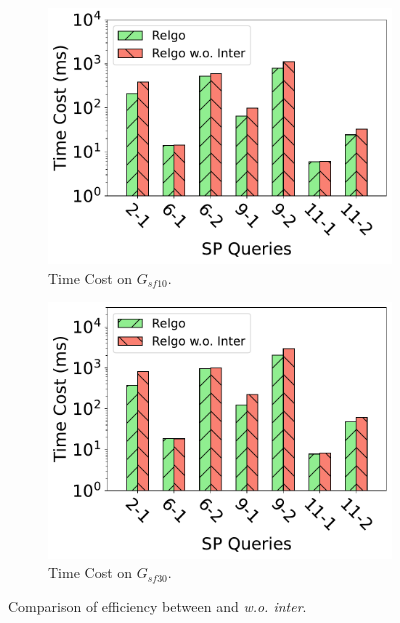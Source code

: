 
\begin{figure}[ht]
    \centering
    \begin{subfigure}[b]{.45\linewidth}
        \centering
        \includegraphics[width=\linewidth]{./figures/exp/filter_sf10.pdf}
        \caption{Time Cost on $G_{sf10}$.}
        \label{fig:exp-filter-sf10}
    \end{subfigure}
    \begin{subfigure}[b]{0.45\linewidth}
        \centering
        \includegraphics[width=\linewidth]{./figures/exp/filter_sf30.pdf}
        \caption{Time Cost on $G_{sf30}$.}
        \label{fig:exp-filter-sf30}
    \end{subfigure}
    \caption{Comparison of efficiency between \relgo and \textit{\relgo w.o. inter}.}
    \label{fig:exp-filter}
\end{figure}

